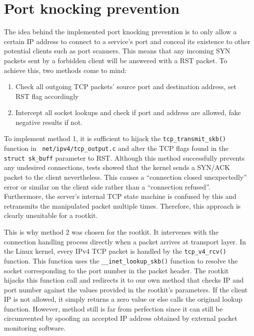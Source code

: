 \section{Port knocking prevention}
The idea behind the implemented port knocking prevention is to only allow a 
certain
IP address to connect to a service's port and conceal its existence to other 
potential clients such as port scanners. 
This means that any incoming SYN packets sent by a forbidden client will be 
answered with a RST packet. To achieve this,
two methods come to mind:
\begin{enumerate}
 \item Check all outgoing TCP packets' source port and destination address, set 
RST flag accordingly
 \item Intercept all socket lookups and check if port and address are allowed, 
fake negative results if not.
\end{enumerate}
To implement method 1, it is sufficient to hijack the 
\verb+tcp_transmit_skb()+ function in ~\verb+net/ipv4/tcp_output.c+ and alter 
the TCP flags found in the \verb+struct sk_buff+
parameter to RST. Although this method successfully prevents any undesired 
connections, tests showed that the kernel sends a SYN/ACK
packet to the client nevertheless. This causes a ``connection closed 
unexpectedly'' error or similar on the client side rather than a
``connection refused''. Furthermore, the server's internal TCP state machine is 
confused by this and retransmits the manipulated packet
multiple times. Therefore, this approach is clearly unsuitable for a rootkit. 
\par
This is why method 2 was chosen for the rootkit. It intervenes with the 
connection handling process directly when a packet arrives at transport layer.
In the Linux kernel, every IPv4 TCP packet is handled by the 
\texttt{tcp\_v4\_rcv()} function. This 
function uses the \texttt{\_\_inet\_lookup\_skb()} function to resolve the 
socket 
corresponding to the port number in the packet header. The rootkit hijacks this 
function call and
redirects it to our own method that checks IP and port number against the values 
provided in the rootkit's parameters. If the client IP
is not allowed, it simply returns a zero value or else calls the original 
lookup 
function.
However, method still is far from perfection since it can still be circumvented 
by spoofing an accepted IP address obtained by external packet monitoring 
software.
